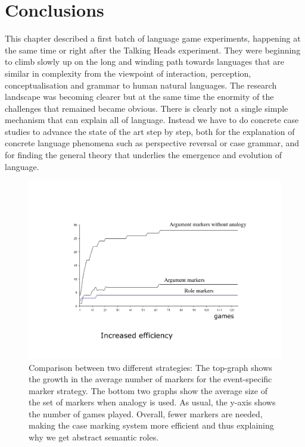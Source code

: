 \section{Conclusions} 

This chapter described a first batch of language game experiments, happening at the same time or right after the Talking Heads 
experiment. They were beginning to climb slowly up on the long and winding path towards languages that are similar in 
complexity from the viewpoint of interaction, perception, conceptualisation and grammar to human natural languages. 
The research landscape was becoming clearer but at the same time the enormity of the challenges that remained
became obvious. There is clearly not a single simple mechanism that can explain all of language. Instead we have 
to do concrete case studies to advance the state of the art step by step, both for the explanation of concrete language 
phenomena such as perspective reversal or case grammar, and for finding the general theory that underlies the 
emergence and evolution of language. 


\begin{figure}[h]
  \centerline{\includegraphics[width=\textwidth]{chap10/figs/comparison.pdf}}
\caption{\label{fig:comparison}Comparison between two different strategies: The top-graph shows the growth in the average number of 
markers for the event-specific marker strategy. 
The bottom two graphs show the average size of the set of markers when analogy is used. As usual, the y-axis shows 
the number of games played. Overall, fewer markers are needed, making the case marking system more efficient 
and thus explaining why we get abstract semantic roles.}
\end{figure}


